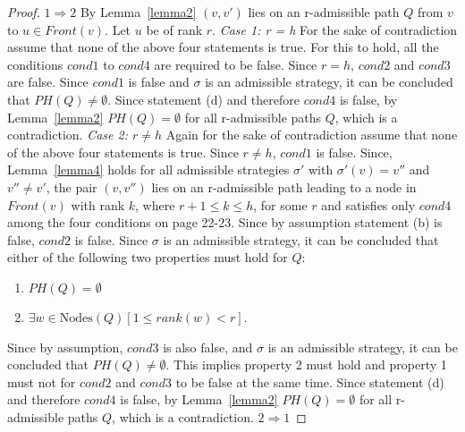 \begin{proof}
	$\mathit{1} \Rightarrow \mathit{2}$
	\newline By Lemma~\ref{lemma2} $(v,v')$ lies on an r-admissible path $Q$ from $v$ to $u \in \mathit{Front}(v)$. Let $u$ be of rank $r$.
	\newline \textit{Case 1: r = h}
	\newline For the sake of contradiction assume that none of the above four statements is true. For this to hold, all the conditions $cond1$ to $cond4$ are required to be false. Since $r = h$, $cond2$ and $cond3$ are false. Since $cond1$ is false and $\sigma$ is an admissible strategy, it can be concluded that $\mathrm{\mathit{PH}}(Q) \neq \emptyset$. Since statement (d) and therefore $cond4$ is false, by Lemma~\ref{lemma2} $\mathrm{\mathit{PH}}(Q) = \emptyset$ for all r-admissible paths $Q$, which is a contradiction.  
	\newline \textit{Case 2: $r \neq h$}
	\newline Again for the sake of contradiction assume that none of the above four statements is true. Since $r \neq h$, $cond1$ is false. Since, Lemma~\ref{lemma4} holds for all admissible strategies $\sigma'$ with $\sigma'(v) = v''$ and $v'' \neq v'$, the pair $(v,v'')$ lies on an r-admissible path leading to a node in $\mathit{Front}(v)$ with rank $k$, where $r+1 \leq k \leq h$, for some $r$ and satisfies only $cond4$ among the four conditions on page 22-23. Since by assumption statement (b) is false, $cond2$ is false. Since $\sigma$ is an admissible strategy, it can be concluded that either of the following two properties must hold for $Q$:
	\begin{enumerate}
		\item $\mathrm{\mathit{PH}}(Q) = \emptyset$
		\item $\exists w \in \mathrm{Nodes}(Q)[1 \leq rank(w) < r]$.
	\end{enumerate}
	Since by assumption, $cond3$ is also false, and $\sigma$ is an admissible strategy, it can be concluded that $\mathit{PH}(Q) \neq \emptyset$. This implies property 2 must hold and property 1 must not for $cond2$ and $cond3$ to be false at the same time. Since statement (d) and therefore $cond4$ is false, by Lemma~\ref{lemma2} $\mathrm{\mathit{PH}}(Q) = \emptyset$ for all r-admissible paths $Q$, which is a contradiction.
	\newline $\mathit{2} \Rightarrow \mathit{1}$

\end{proof}

